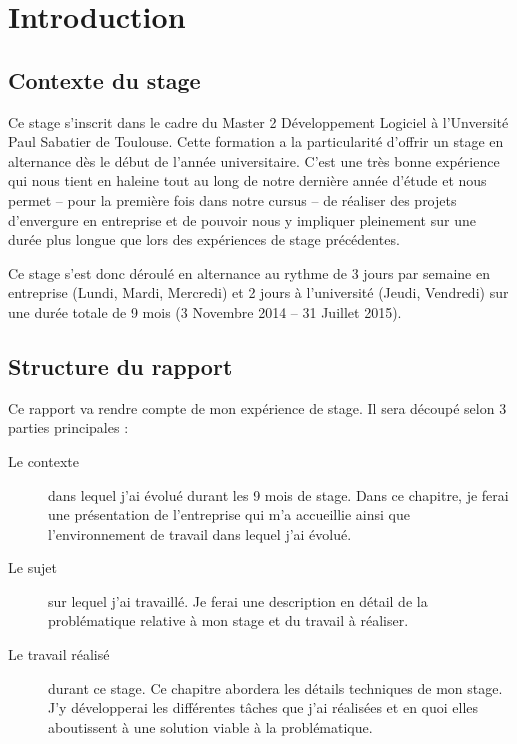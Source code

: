 \chapter{Introduction}

\section*{Contexte du stage}
Ce stage s'inscrit dans le cadre du Master 2 Développement Logiciel à
l'Unversité Paul Sabatier de Toulouse. Cette formation a la particularité
d'offrir un stage en alternance dès le début de l'année universitaire. C'est une
très bonne expérience qui nous tient en haleine tout au long de notre dernière
année d'étude et nous permet -- pour la première fois dans notre cursus -- de
réaliser des projets d'envergure en entreprise et de pouvoir nous y impliquer
pleinement sur une durée plus longue que lors des expériences de stage
précédentes.

Ce stage s'est donc déroulé en alternance au rythme de 3 jours par semaine en
entreprise (Lundi, Mardi, Mercredi) et 2 jours à l'université (Jeudi, Vendredi)
sur une durée totale de 9 mois (3 Novembre 2014 -- 31 Juillet 2015).

\section*{Structure du rapport}
Ce rapport va rendre compte de mon expérience de stage. Il sera découpé selon 3 parties principales :
\begin{description}
	\item[Le contexte] dans lequel j'ai évolué durant les 9 mois de stage. Dans
	  ce chapitre, je ferai une présentation de l'entreprise qui m'a accueillie
	  ainsi que l'environnement de travail dans lequel j'ai évolué.
	\item[Le sujet] sur lequel j'ai travaillé. Je ferai une description en
	  détail de la problématique relative à mon stage et du travail à réaliser.
	\item[Le travail réalisé] durant ce stage. Ce chapitre abordera les détails
	  techniques de mon stage. J'y développerai les différentes tâches que j'ai
	  réalisées et en quoi elles aboutissent à une solution viable à la
	  problématique.
\end{description}

